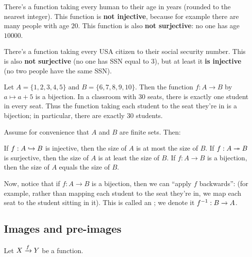 \begin{example}
	\listhack
	\begin{enumerate}[(a)]
		\ii There's a function taking every human to their
		age in years (rounded to the nearest integer).
		This function is \textbf{not injective},
		because for example there are many people with age $20$.
		This function is also \textbf{not surjective}: no one has age $10000$.

		\ii There's a function taking every
		USA citizen to their social security number.
		This is also \textbf{not surjective} (no one has SSN equal to $3$),
		but at least it \textbf{is injective} (no two people have the same SSN).
	\end{enumerate}
\end{example}

\begin{example}
	\listhack
	\begin{enumerate}[(a)]
		\ii Let $A = \{1,2,3,4,5\}$ and $B = \{6,7,8,9,10\}$.
		Then the function $f : A \to B$ by $a \mapsto a+5$ is a bijection.
		\ii In a classroom with $30$ seats,
		there is exactly one student in every seat.
		Thus the function taking each student to the seat they're in
		is a bijection; in particular, there are exactly $30$ students.
	\end{enumerate}
\end{example}

\begin{remark}
	Assume for convenience that $A$ and $B$ are finite sets. Then:
	\begin{itemize}
		\ii If $f : A \hookrightarrow B$ is injective, then the size of $A$ is at most the size of $B$.
		\ii If $f : A \twoheadrightarrow B$ is surjective, then the size of $A$ is at least the size of $B$.
		\ii If $f : A \to B$ is a bijection, then the size of $A$ equals the size of $B$.
	\end{itemize}
\end{remark}

Now, notice that if $f : A \to B$ is a bijection,
then we can ``apply $f$ backwards'':
(for example, rather than mapping each student to the seat they're in,
we map each seat to the student sitting in it).
This is called an ; we denote it $f^{-1} : B \to A$.

\subsection{Images and pre-images}
Let $X \xrightarrow{f} Y$ be a function.

